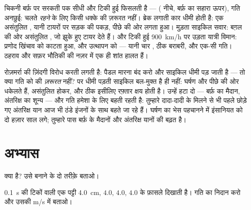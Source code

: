 \begin{example}[इस वाक्य से दुनिया पढ़ना]\label{ex:g9:uniform-varied-motion:reading}
चिकनी बर्फ़ पर सरकती पक सीधी और टिकी हुई फिसलती है ---  
( नीचे, बर्फ़ का सहारा ऊपर), गति अनछुई: चलते \emph{रहने} के लिए
किसी धक्के की ज़रूरत नहीं। ब्रेक लगाती कार धीमी होती है: एक असंतुलित
, यानी टायरों पर सड़क की पकड़, पीछे की ओर लगता हुआ। मुड़ता साइकिल
सवार: बग़ल की ओर असंतुलित , जो झुके हुए टायर देते हैं। और टिकी हुई
\qty{900}{km/h} पर उड़ता यात्री विमान: प्रणोद खिंचाव को काटता हुआ, और
उत्थापन  को --- यानी चार , ठीक बराबरी, और एक-सी गति। ठहराव और
सफ़र भौतिकी की नज़र में एक ही शांत हालत हैं।
\end{example}

\begin{remark}[यह वाक्य चौंकाता क्यों है]\label{rem:g9:uniform-varied-motion:surprise}
रोज़मर्रा की ज़िंदगी विरोध करती लगती है: पैडल मारना बंद करो और साइकिल
धीमी पड़ जाती है --- तो क्या गति को  की \emph{ज़रूरत} नहीं? पर धीमी
पड़ती साइकिल बल-मुक्त है ही नहीं: घर्षण और  पीछे की ओर धकेलते हैं,
असंतुलित होकर, और ठीक इसीलिए रफ़्तार क्षय होती है। उन्हें हटा दो ---
बर्फ़ का मैदान, अंतरिक्ष का शून्य --- और गति हमेशा के लिए बहती रहती
है: तुम्हारे दादा-दादी के मिलने से भी पहले छोड़े गए अंतरिक्ष यान आज भी
ठंडे इंजनों के साथ बहते जा रहे हैं। घर्षण का भेस पहचानने में इंसानियत
को दो हज़ार साल लगे; तुम्हारे पास बर्फ़ के मैदानों और अंतरिक्ष यानों की
बढ़त है।
\end{remark}

\section{अभ्यास}

\begin{exercise}[$\star$]\label{exo:g9:uniform-varied-motion:1}
 क्या है? उसे बनाने के दो तरीक़े बताओ।
\end{exercise}

\begin{exercise}[$\star$]\label{exo:g9:uniform-varied-motion:2}
\qty{0.1}{s} की टिकों वाली एक पट्टी \qty{4.0}{cm}, $4.0$, $4.0$,
$4.0$ के फ़ासले दिखाती है। गति का निदान करो और उसकी  \unit{m/s} में
बताओ।
\end{exercise}

